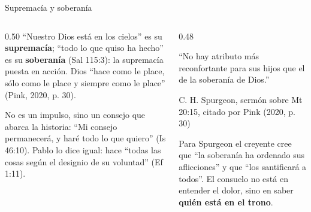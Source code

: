 \documentclass[hyperref={bookmarks=false},aspectratio=169]{beamer}
\newcommand{\destacar}[1]{\textbf{\textcolor{azul}{#1}}}
\begin{document}
\begin{frame}{Supremacía y soberanía}
\begin{columns}[t,onlytextwidth]
\begin{column}{0.50\textwidth}\small
``Nuestro Dios está en los cielos'' es su \destacar{supremacía}; ``todo lo que quiso ha hecho'' es su \destacar{soberanía} (Sal 115:3): la supremacía puesta en acción. Dios ``hace como le place, sólo como le place y siempre como le place'' (Pink, 2020, p. 30).\par\medskip
No es un impulso, sino un consejo que abarca la historia: ``Mi consejo permanecerá, y haré todo lo que quiero'' (Is 46:10). Pablo lo dice igual: hace ``todas las cosas según el designio de su voluntad'' (Ef 1:11).
\end{column}
\begin{column}{0.48\textwidth}
\begin{tcolorbox}[colback=papiro,colframe=dorado,boxrule=1.2pt,arc=3pt]
\footnotesize ``No hay atributo más reconfortante para sus hijos que el de la soberanía de Dios.''\par\hfill{\scriptsize C. H. Spurgeon, sermón sobre Mt 20:15, citado por Pink (2020, p. 30)}
\end{tcolorbox}
\small Para Spurgeon el creyente cree que ``la soberanía ha ordenado sus aflicciones'' y que ``los santificará a todos''. El consuelo no está en entender el dolor, sino en saber \destacar{quién está en el trono}.
\end{column}
\end{columns}
\end{frame}
\end{document}
